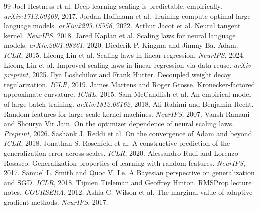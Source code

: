 \documentclass{article}
\begin{document}
\begin{thebibliography}{99}
 Joel Hestness et al. Deep learning scaling is predictable, empirically. \emph{arXiv:1712.00409}, 2017.
 Jordan Hoffmann et al. Training compute-optimal large language models. \emph{arXiv:2203.15556}, 2022.
 Arthur Jacot et al. Neural tangent kernel. \emph{NeurIPS}, 2018.
 Jared Kaplan et al. Scaling laws for neural language models. \emph{arXiv:2001.08361}, 2020.
 Diederik P. Kingma and Jimmy Ba. Adam. \emph{ICLR}, 2015.
 Licong Lin et al. Scaling laws in linear regression. \emph{NeurIPS}, 2024.
 Licong Lin et al. Improved scaling laws in linear regression via data reuse. \emph{arXiv preprint}, 2025.
 Ilya Loshchilov and Frank Hutter. Decoupled weight decay regularization. \emph{ICLR}, 2019.
 James Martens and Roger Grosse. Kronecker-factored approximate curvature. \emph{ICML}, 2015.
 Sam McCandlish et al. An empirical model of large-batch training. \emph{arXiv:1812.06162}, 2018.
 Ali Rahimi and Benjamin Recht. Random features for large-scale kernel machines. \emph{NeurIPS}, 2007.
 Vansh Ramani and Shourya Vir Jain. On the optimizer dependence of neural scaling laws. \emph{Preprint}, 2026.
 Sashank J. Reddi et al. On the convergence of Adam and beyond. \emph{ICLR}, 2018.
 Jonathan S. Rosenfeld et al. A constructive prediction of the generalization error across scales. \emph{ICLR}, 2020.
 Alessandro Rudi and Lorenzo Rosasco. Generalization properties of learning with random features. \emph{NeurIPS}, 2017.
 Samuel L. Smith and Quoc V. Le. A Bayesian perspective on generalization and SGD. \emph{ICLR}, 2018.
 Tijmen Tieleman and Geoffrey Hinton. RMSProp lecture notes. \emph{COURSERA}, 2012.
 Ashia C. Wilson et al. The marginal value of adaptive gradient methods. \emph{NeurIPS}, 2017.
\end{thebibliography}
\end{document}
